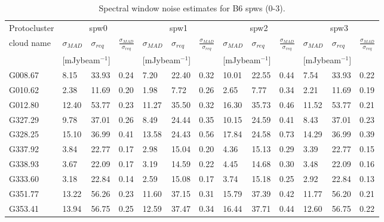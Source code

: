 \begin{table}[htbp!]
\ContinuedFloat
\centering
\caption{Spectral window noise estimates for B6 spws (0-3).}
\begin{tabular}{@{\extracolsep{4pt}}lllllllllllll@{}}

\hline \noalign {\smallskip}
Protocluster  & \multicolumn{3}{c}{spw0}  & \multicolumn{3}{c}{spw1}  & \multicolumn{3}{c}{spw2}
    & \multicolumn{3}{c}{spw3} \\ %
\cline{2-4}\cline{5-7}\cline{8-10}\cline{11-13}
cloud name\tnote{1}  & $\sigma_{MAD}$ & $\sigma_{req}$ & $\frac{\sigma_{MAD}}{\sigma_{req}}$  & $\sigma_{MAD}$ & $\sigma_{req}$ & $\frac{\sigma_{MAD}}{\sigma_{req}}$  & $\sigma_{MAD}$ & $\sigma_{req}$ & $\frac{\sigma_{MAD}}{\sigma_{req}}$  & $\sigma_{MAD}$ & $\sigma_{req}$ & $\frac{\sigma_{MAD}}{\sigma_{req}}$\\
& \multicolumn{2}{c}{[mJybeam$^{-1}$]}& & \multicolumn{2}{c}{[mJybeam$^{-1}$]}& &  \multicolumn{2}{c}{[mJybeam$^{-1}$]}& & \multicolumn{2}{c}{[mJybeam$^{-1}$]}\\
\hline \noalign {\smallskip}
G008.67  &  8.15 & 33.93 & 0.24 & 7.20 & 22.40 & 0.32 & 10.01 & 22.55 & 0.44 & 7.54 & 33.93 & 0.22 \\
G010.62  &  2.38 & 11.69 & 0.20 & 1.98 & 7.72 & 0.26 & 2.65 & 7.77 & 0.34 & 2.21 & 11.69 & 0.19 \\
G012.80  &  12.40 & 53.77 & 0.23 & 11.27 & 35.50 & 0.32 & 16.30 & 35.73 & 0.46 & 11.52 & 53.77 & 0.21 \\
G327.29  &  9.78 & 37.01 & 0.26 & 8.49 & 24.44 & 0.35 & 10.15 & 24.59 & 0.41 & 8.43 & 37.01 & 0.23 \\
G328.25  &  15.10 & 36.99 & 0.41 & 13.58 & 24.43 & 0.56 & 17.84 & 24.58 & 0.73 & 14.29 & 36.99 & 0.39 \\
G337.92  &  3.84 & 22.77 & 0.17 & 2.98 & 15.04 & 0.20 & 4.36 & 15.13 & 0.29 & 3.39 & 22.77 & 0.15 \\
G338.93  &  3.67 & 22.09 & 0.17 & 3.19 & 14.59 & 0.22 & 4.45 & 14.68 & 0.30 & 3.48 & 22.09 & 0.16 \\
G333.60  &  3.18 & 22.84 & 0.14 & 2.59 & 15.08 & 0.17 & 3.74 & 15.18 & 0.25 & 2.92 & 22.84 & 0.13 \\
G351.77  &  13.22 & 56.26 & 0.23 & 11.60 & 37.15 & 0.31 & 15.79 & 37.39 & 0.42 & 11.77 & 56.20 & 0.21 \\
G353.41  &  13.94 & 56.75 & 0.25 & 12.59 & 37.47 & 0.34 & 16.44 & 37.71 & 0.44 & 12.60 & 56.75 & 0.22 \\

\end{tabular}
\end{table}
